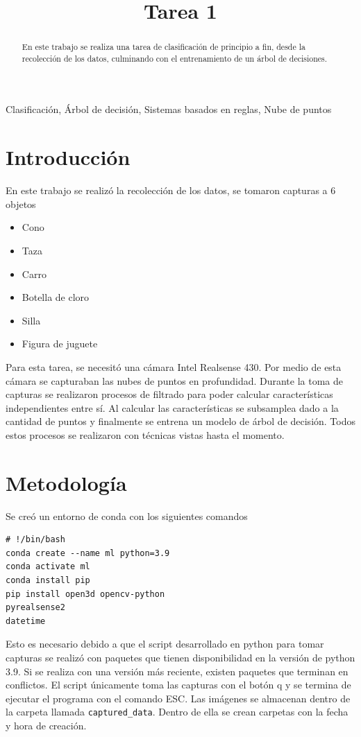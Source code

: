 \documentclass[conference]{IEEEtran}
\begin{document}
\title{Tarea 1}

\author{
}
\maketitle
\begin{abstract}
En este trabajo se realiza una tarea de clasificación de principio a fin, desde la recolección de los datos, culminando con el entrenamiento de un árbol de decisiones.
\end{abstract}
\begin{IEEEkeywords}
Clasificación, Árbol de decisión, Sistemas basados en reglas, Nube de puntos
\end{IEEEkeywords}

\section{Introducción}
En este trabajo se realizó la recolección de los datos, se tomaron capturas a 6 objetos
\begin{itemize}
    \item Cono
    \item Taza
    \item Carro
    \item Botella de cloro
    \item Silla
    \item Figura de juguete
\end{itemize}
Para esta tarea, se necesitó una cámara Intel Realsense 430. Por medio de esta cámara se capturaban las nubes de puntos en profundidad. Durante la toma de capturas se realizaron procesos de filtrado para poder calcular características independientes entre sí. Al calcular las características se subsamplea dado a la cantidad de puntos y finalmente se entrena un modelo de árbol de decisión. Todos estos procesos se realizaron con técnicas vistas hasta el momento.

\section{Metodología}
Se creó un entorno de conda con los siguientes comandos
\begin{verbatim}
# !/bin/bash
conda create --name ml python=3.9
conda activate ml
conda install pip
pip install open3d opencv-python 
pyrealsense2
datetime
\end{verbatim}
Esto es necesario debido a que el script desarrollado en python para tomar capturas se realizó con paquetes que tienen disponibilidad en la versión de python 3.9. Si se realiza con una versión más reciente, existen paquetes que terminan en conflictos. El script únicamente toma las capturas con el botón q y se termina de ejecutar el programa con el comando ESC. Las imágenes se almacenan dentro de la carpeta llamada \texttt{captured\_data}. Dentro de ella se crean carpetas con la fecha y hora de creación.
\end{document}
